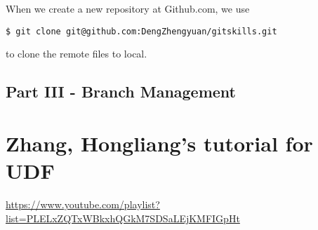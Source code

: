 \documentclass[11pt]{article}
\begin{document}
When we create a new repository at Github.com, we use
\begin{lstlisting}[basicstyle=\small\conso]
    $ git clone git@github.com:DengZhengyuan/gitskills.git
\end{lstlisting}
to clone the remote files to local.

\subsection{Part III - Branch Management}



\section{Zhang, Hongliang's tutorial for UDF}
\url{https://www.youtube.com/playlist?list=PLELxZQTxWBkxhQGkM7SDSaLEjKMFIGpHt}
\end{document}
